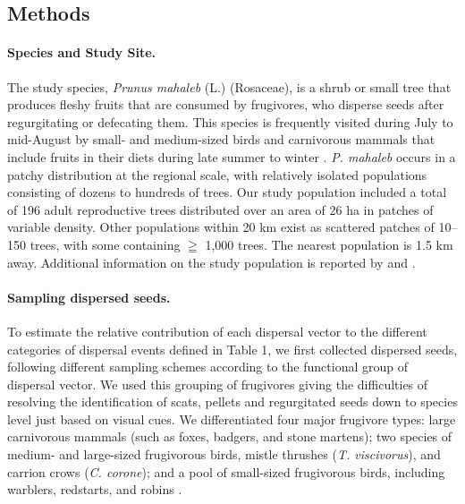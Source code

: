 \documentclass[a4paper, 12pt]{article}
\begin{document}
\begin{linenumbers}

\section*{Methods}

\paragraph*{Species and Study Site.} The study species, \textit{Prunus mahaleb} (L.) (Rosaceae), is a shrub or small tree that produces fleshy fruits that are consumed by frugivores, who disperse seeds after regurgitating or defecating them. This species is frequently visited during July to mid-August by small- and medium-sized birds and carnivorous mammals that include fruits in their diets during late summer to winter \citep{Jordano:2000ft}. \textit{P. mahaleb} occurs in a patchy distribution at the regional scale, with relatively isolated populations consisting of dozens to hundreds of trees. Our study population included a total of 196 adult reproductive trees distributed over an area of 26 ha in patches of variable density. Other populations within 20 km exist as scattered patches of 10–150 trees, with some containing $\geqq$ 1,000 trees. The nearest population is 1.5 km away. Additional information on the study population is reported by \citet{Jordano:2007} and \citet{Garcia:2009do}.

\paragraph*{Sampling dispersed seeds.} 
To estimate the relative contribution of each dispersal vector to the different categories of dispersal events defined in Table 1, we first collected dispersed seeds, following different sampling schemes according to the functional group of dispersal vector. We used this grouping of frugivores giving the difficulties of resolving the identification of scats, pellets and regurgitated seeds down to species level just based on visual cues. We differentiated four major frugivore types: large carnivorous mammals (such as foxes, badgers, and stone martens); two species of medium- and large-sized frugivorous birds, mistle thrushes (\textit{T. viscivorus}), and carrion crows (\textit{C. corone}); and a pool of small-sized frugivorous birds, including warblers, redstarts, and robins \citep{Jordano:2007}. 


\end{linenumbers}
\end{document}
